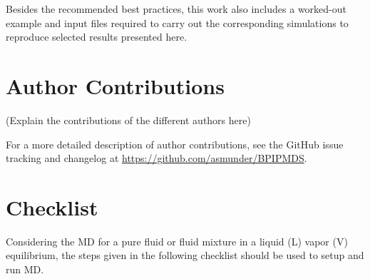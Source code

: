 \documentclass[9pt,bestpractices]{livecoms}
\newcommand{\githubrepository}{\url{https://github.com/asmunder/BPIPMDS}}  %
\begin{document}
Besides the recommended best practices, this work also includes a worked-out
example and input files required to carry out the corresponding simulations to
reproduce selected results presented here.


%
%


\section{Author Contributions}
%

(Explain the contributions of the different authors here)

For a more detailed description of author contributions,
see the GitHub issue tracking and changelog at \githubrepository.


\clearpage

\section{Checklist}
\label{checklist}
Considering the MD for a pure fluid or fluid mixture in a liquid (L) \textendash{} vapor (V) equilibrium, the steps given in the following checklist should be used to setup and run MD.
\end{document}
